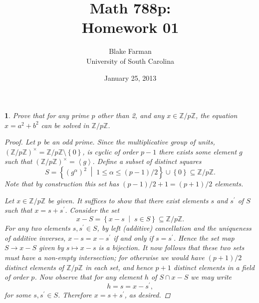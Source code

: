 \documentclass[10pt]{amsart}
\author{Blake Farman\\University of South Carolina}
\title{Math 788p:\\Homework 01}
\date{January 25, 2013}
\newcommand{\Z}{\mathbb{Z}}
\newcommand{\abs}[1]{\left| #1 \right|}
\begin{document}
\maketitle

\providecommand{\p}{\mathfrak{p}}
\providecommand{\m}{\mathfrak{m}}

\newtheorem{thm}{}
\newtheorem{lem}{Lemma}

\begin{thm}
  Prove that for any prime $p$ other than 2, and any $x \in \Z/p\Z$, the equation $x = a^2 + b^2$ can be solved in $\Z/p\Z$.
  \begin{proof}
    Let $p$ be an odd prime.
    Since the multiplicative group of units, $\left(\Z/p\Z\right)^\times = \Z/p\Z \setminus \left\{0\right\}$, is cyclic of order $p-1$ there exists some element $g$ such that $\left(\Z/p\Z\right)^\times = \left<g\right>.$
    Define a subset of distinct squares $$S = \left\{(g^\alpha)^2 \;\middle\vert\; 1 \leq \alpha \leq (p-1)/2 \right\} \cup \left\{0\right\} \subseteq \Z/p\Z.$$
    Note that by construction this set has $(p-1)/2 + 1 = (p + 1)/2$ elements.
    
    Let $x \in \Z/p\Z$ be given.
    It suffices to show that there exist elements $s$ and $s^\prime$ of $S$ such that $x = s + s^\prime$.
    Consider the set
    $$x - S = \left\{x - s \;\middle\vert\; s \in S\right\} \subseteq \Z/p\Z.$$
    For any two elements $s, s^\prime \in S$, by left (additive) cancellation and the uniqueness of additive inverses, $x - s = x - s^\prime$ if and only if $s = s^\prime$.
    Hence the set map $S \rightarrow x - S$ given by $s \mapsto x - s$ is a bijection.
    It now follows that these two sets must have a non-empty intersection; for otherwise we would have $(p + 1) / 2$ distinct elements of $\Z/p\Z$ in each set, and hence $p + 1$ distinct elements in a field of order $p$.
    Now observe that for any element $h$ of $S \cap x - S$ we may write $$h = s = x - s^\prime,$$ for some $s,s^\prime \in S$. 
    Therefore $x = s + s^\prime$, as desired.
  \end{proof}
\end{thm}
\end{document}
